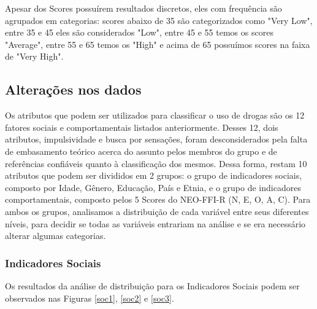 \documentclass[
	article,			%
	11pt,				%
	oneside,			%
	a4paper,			%
	english,			%
	brazil,				%
	sumario=tradicional
	]{abntex2}
\begin{document}
Apesar dos Scores possuírem resultados discretos, eles com frequência são agrupados em categorias: scores abaixo de 35 são categorizados como "Very Low", entre 35 e 45 eles são considerados "Low", entre 45 e 55 temos os scores "Average", entre 55 e 65 temos os "High" e acima de 65 possuímos scores na faixa de "Very High".

\subsection{Alterações nos dados}

Os atributos que podem ser utilizados para classificar o uso de drogas são os 12 fatores sociais e comportamentais listados anteriormente. Desses 12, dois atributos, impulsividade e busca por sensações, foram desconsiderados pela falta de embasamento teórico acerca do assunto pelos membros do grupo e de referências confiáveis quanto à classificação dos mesmos. Dessa forma, restam 10 atributos que podem ser divididos em 2 grupos: o grupo de indicadores sociais, composto por Idade, Gênero, Educação, País e Etnia, e o grupo de indicadores comportamentais, composto pelos 5 Scores do NEO-FFI-R (N, E, O, A, C). Para ambos os grupos, analisamos a distribuição de cada variável entre seus diferentes níveis, para decidir se todas as variáveis entrariam na análise e se era necessário alterar algumas categorias.

\subsubsection{Indicadores Sociais}

Os resultados da análise de distribuição para os Indicadores Sociais podem ser observados nas Figuras \ref{soc1}, \ref{soc2} e \ref{soc3}.
\end{document}
